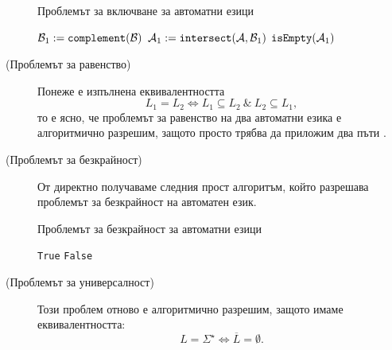 \begin{description}
  \begin{algorithm}[H]
    \caption{Проблемът за включване за автоматни езици}
    \label{alg:regular:pumping-applications:inclusion}
    \begin{algorithmic}[1]
      \State $\mathcal{B}_1 := \texttt{complement}(\mathcal{B})$
      \State $\mathcal{A}_1 := \texttt{intersect}(\mathcal{A},\mathcal{B}_1)$
      \State \Return $\texttt{isEmpty}(\mathcal{A}_1)$
      \EndProcedure
    \end{algorithmic}
  \end{algorithm}
\item[(Проблемът за равенство)]
  Понеже е изпълнена еквивалентността
  \[L_1 = L_2 \iff L_1 \subseteq L_2\ \&\ L_2 \subseteq L_1,\]
  то е ясно, че проблемът за равенство на два автоматни езика е алгоритмично разрешим,
  защото просто трябва да приложим два пъти .
\item[(Проблемът за безкрайност)]
  От  директно получаваме следния прост алгоритъм,
  който разрешава проблемът за безкрайност на автоматен език.
    \begin{algorithm}[H]
    \caption{Проблемът за безкрайност за автоматни езици}
    \label{alg:regular:pumping-applications:infinity}
    \begin{algorithmic}[1]
      \State \Return \texttt{True}
      \EndIf
      \EndFor
      \EndFor
      \State \Return \texttt{False}
      \EndProcedure
    \end{algorithmic}
  \end{algorithm}
\item[(Проблемът за универсалност)]
  Този проблем отново е алгоритмично разрешим, защото имаме еквивалентността:
  \[L = \Sigma^\star \iff \overline{L} = \emptyset.\]
\end{description}


